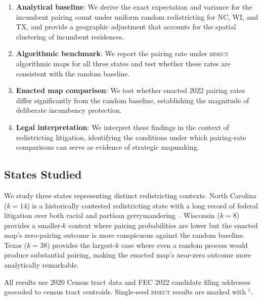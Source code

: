 \begin{enumerate}
  \item \textbf{Analytical baseline}: We derive the exact expectation and variance for
    the incumbent pairing count under uniform random redistricting for NC, WI, and TX,
    and provide a geographic adjustment that accounts for the spatial clustering of
    incumbent residences.
  \item \textbf{Algorithmic benchmark}: We report the pairing rate under \textsc{bisect}
    algorithmic maps for all three states and test whether these rates are consistent
    with the random baseline.
  \item \textbf{Enacted map comparison}: We test whether enacted 2022 pairing rates
    differ significantly from the random baseline, establishing the magnitude of deliberate
    incumbency protection.
  \item \textbf{Legal interpretation}: We interpret these findings in the context of
    redistricting litigation, identifying the conditions under which pairing-rate
    comparisons can serve as evidence of strategic mapmaking.
\end{enumerate}

\subsection{States Studied}

We study three states representing distinct redistricting contexts. North Carolina
($k=14$) is a historically contested redistricting state with a long record of federal
litigation over both racial and partisan gerrymandering~\citep{shaw1993, harper2022}.
Wisconsin ($k=8$) provides a smaller-$k$ context where pairing probabilities are
lower but the enacted map's zero-pairing outcome is more conspicuous against the random
baseline. Texas ($k=38$) provides the largest-$k$ case where even a random process
would produce substantial pairing, making the enacted map's near-zero outcome more
analytically remarkable.

All results use 2020 Census tract data and FEC 2022 candidate filing addresses
geocoded to census tract centroids. Single-seed \textsc{bisect} results are marked
with $^\dagger$.
